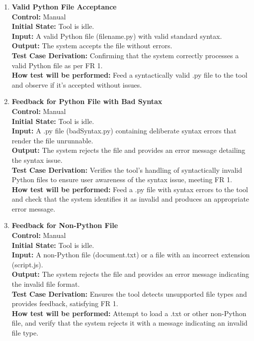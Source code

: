 \documentclass[12pt, titlepage]{article}
\begin{document}
\begin{enumerate}[label={\bf \textcolor{Maroon}{test-FR-IA-\arabic*}}, wide=0pt, font=\itshape]
  \item \textbf{Valid Python File Acceptance} \\[2mm]
    \textbf{Control:} Manual \\    
    \textbf{Initial State:} Tool is idle.  \\
    \textbf{Input:} A valid Python file (filename.py) with valid standard syntax. \\
    \textbf{Output:} The system accepts the file without errors.\\[2mm]
    \textbf{Test Case Derivation:} Confirming that the system correctly processes a valid Python file as per FR 1.\\[2mm]
    \textbf{How test will be performed:} Feed a syntactically valid .py file to the tool and observe if it’s accepted without issues.
            
  \item \textbf{Feedback for Python File with Bad Syntax} \\[2mm]
    \textbf{Control:} Manual \\
    \textbf{Initial State:} Tool is idle. \\
    \textbf{Input:} A .py file (badSyntax.py) containing deliberate syntax errors that render the file unrunnable. \\
    \textbf{Output:} The system rejects the file and provides an error message detailing the syntax issue. \\[2mm]
    \textbf{Test Case Derivation:} Verifies the tool’s handling of syntactically invalid Python files to ensure user awareness of the syntax issue, meeting FR 1. \\[2mm]
    \textbf{How test will be performed:} Feed a .py file with syntax errors to the tool and check that the system identifies it as invalid and produces an appropriate error message.

  \item \textbf{Feedback for Non-Python File}\\[2mm]
    \textbf{Control:} Manual \\
    \textbf{Initial State:} Tool is idle.\\
    \textbf{Input:} A non-Python file (document.txt) or a file with an incorrect extension (script.js).\\
    \textbf{Output:} The system rejects the file and provides an error message indicating the invalid file format.\\[2mm]
    \textbf{Test Case Derivation:} Ensures the tool detects unsupported file types and provides feedback, satisfying FR 1.\\[2mm]
    \textbf{How test will be performed:} Attempt to load a .txt or other non-Python file, and verify that the system rejects it with a message indicating an invalid file type.


\end{enumerate}
\end{document}
